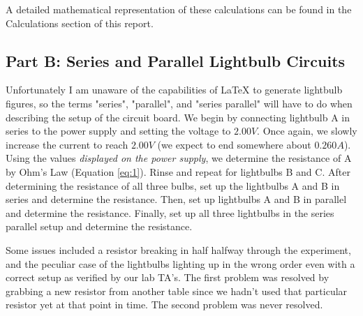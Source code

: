 \documentclass{article}
\theoremstyle{definition}
\begin{document}
A detailed mathematical representation of these calculations can be found in the Calculations section of this report.
\subsection*{Part B: Series and Parallel Lightbulb Circuits}
Unfortunately I am unaware of the capabilities of \LaTeX{} to generate lightbulb figures, so the terms "series", "parallel", and "series parallel"
will have to do when describing the setup of the circuit board. We begin by connecting lightbulb A in series to the power supply
and setting the voltage to $2.00V$. Once again, we slowly increase the current to reach $2.00V$ (we expect to end somewhere about $0.260A$).
Using the values \textit{displayed on the power supply}, we determine the resistance of A by Ohm's Law (Equation \ref{eq:1}).
Rinse and repeat for lightbulbs B and C. After determining the resistance of all three bulbs, set up the lightbulbs A and B in series and determine
the resistance. Then, set up lightbulbs A and B in parallel and determine the resistance. Finally, set up all three lightbulbs in the
series parallel setup and determine the resistance. 


Some issues included a resistor breaking in half halfway through the experiment, and the peculiar case of the lightbulbs
lighting up in the wrong order even with a correct setup as verified by our lab TA's. The first problem was resolved by grabbing 
a new resistor from another table since we hadn't used that particular resistor yet at that point in time. The second problem was never resolved.
\end{document}
